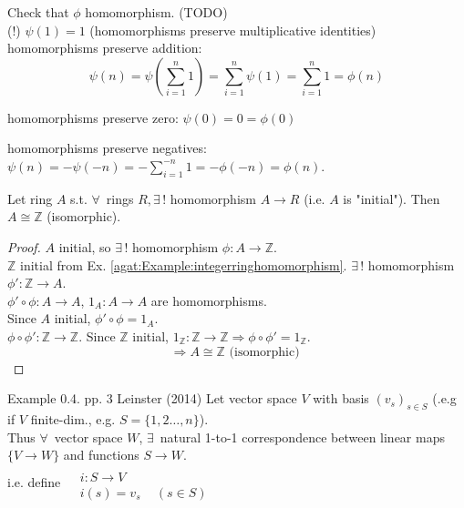 Check that $\phi$ homomorphism. (TODO)\\

(!) $\psi(1)= 1$ (homomorphisms preserve multiplicative identities) \\
homomorphisms preserve addition:
\[
\psi(n) = \psi(\sum_{i=1}^n 1) = \sum_{i=1}^n \psi(1) = \sum_{i = 1}^n 1 = \phi(n)
\]

homomorphisms preserve zero: $\psi(0) = 0 = \phi(0)$

homomorphisms preserve negatives: $\psi(n) = -\psi(-n) = -\sum_{i=1}^{-n} 1 = -\phi(-n) = \phi(n)$.

\begin{lemma}
	Let ring $A$ s.t. $\forall \,$ rings $R, \exists \, !$ homomorphism $A \to R$ (i.e. $A$ is "initial"). Then $A \cong \mathbb{Z}$ (isomorphic). 	
\end{lemma}

\begin{proof}
		$A$ initial, so $\exists \, !$ homomorphism $\phi:A \to \mathbb{Z}$. \\
		$\mathbb{Z}$ initial from Ex. \ref{agat:Example:integerringhomomorphism}. $\exists \, !$ homomorphism $\phi' : \mathbb{Z} \to A$. \\
		
		$\phi' \circ \phi : A \to A$, $1_A : A \to A$ are homomorphisms. \\
		Since $A$ initial, $\phi' \circ \phi = 1_A$. \\
		$\phi \circ \phi' : \mathbb{Z}\to \mathbb{Z}$.  Since $\mathbb{Z}$ initial, $1_{\mathbb{Z}} : \mathbb{Z} \to \mathbb{Z} \Longrightarrow \phi \circ \phi' = 1_{\mathbb{Z}}$. 
		\[
		\Longrightarrow A \cong \mathbb{Z} \text{ (isomorphic) }
		\]
\end{proof}

Example 0.4. pp. 3 Leinster (2014) \cite{agat:Lein2014} Let vector space $V$ with basis $(v_s)_{s \in S}$ (.e.g if $V$ finite-dim., e.g. $S = \lbrace 1, 2 \dots , n \rbrace$).  \\
Thus $\forall \, $ vector space $W$, $\exists \, $ natural 1-to-1 correspondence between linear maps $\lbrace V \to W \rbrace$ and functions $S \to W$. \\
i.e. define $\begin{aligned} & \quad \\ 
& i : S \to V \\
& i(s) = v_s \quad \, (s \in S)\end{aligned}$ 

